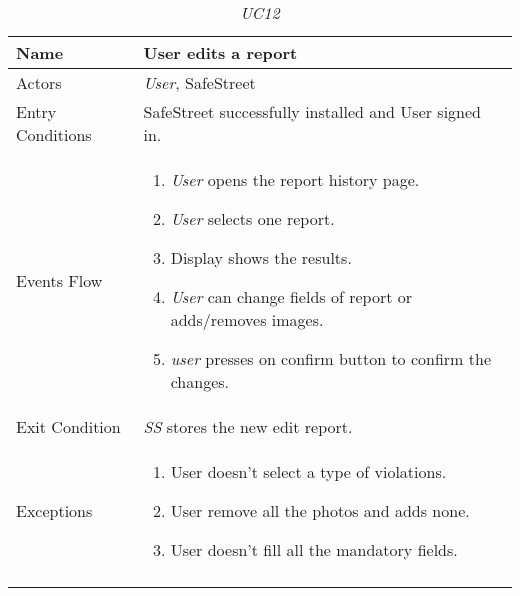 \documentclass[../../../RASD.tex]{subfiles}
\begin{document}
    \begin{center}
        \begin{longtable}{| p{.35\linewidth} | p{.65\linewidth} |}
            \hline
            \textbf{Name} & \textbf{User edits a report}\\ \hline
            Actors & \textit{User}, SafeStreet\\ \hline
            Entry Conditions & SafeStreet successfully installed and User signed in.\\ \hline
            Events Flow &
            \begin{enumerate}
                \item \textit{User} opens the report history page.
                \item \textit{User} selects one report.
                \item  Display shows the results.
                \item \textit{User} can change fields of report or adds/removes images.
                \item \textit{user} presses on confirm button to confirm the changes.
            \end{enumerate}
            \\ \hline
            Exit Condition & \textit{SS} stores the new edit report.\\ \hline
            Exceptions &
            \begin{enumerate}
                \item User doesn’t select a type of violations.
                \item User remove all the photos and adds none.
                \item User doesn’t fill all the mandatory fields.
            \end{enumerate}
            \\
            \hline
            \caption{\textit{UC12}}
        \end{longtable}
    \end{center}
\newpage
\end{document}
